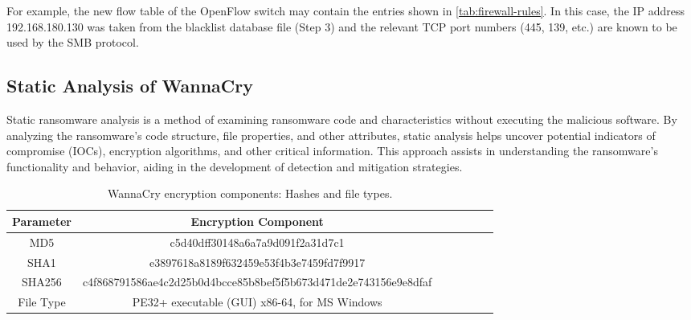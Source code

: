 \documentclass[12pt,letterpaper]{article}
\begin{document}
        For example, the new flow table of the OpenFlow switch may contain the entries shown in \autoref{tab:firewall-rules}. In this case, the IP address 192.168.180.130 was taken from the blacklist database file (Step 3) and the relevant TCP port numbers (445, 139, etc.) are known to be used by the SMB protocol.

    
    \subsection{Static Analysis of WannaCry}

        Static ransomware analysis is a method of examining ransomware code and characteristics without executing the malicious software. By analyzing the ransomware's code structure, file properties, and other attributes, static analysis helps uncover potential indicators of compromise (IOCs), encryption algorithms, and other critical information. This approach assists in understanding the ransomware's functionality and behavior, aiding in the development of detection and mitigation strategies.
    
            \begin{table}[ht]
                \centering
                \caption{WannaCry encryption components: Hashes and file types.}
                \label{tab:WannaCry Exec Components}
                \begin{tabular}{ccccccc}
                    \toprule
                    \textbf{Parameter} & \textbf{Encryption Component} \\
                    \midrule
                    MD5 & c5d40dff30148a6a7a9d091f2a31d7c1 \\
                    SHA1 & e3897618a8189f632459e53f4b3e7459fd7f9917 \\
                    SHA256 & c4f868791586ae4c2d25b0d4bcce85b8bef5f5b673d471de2e743156e9e8dfaf \\
                    File Type & PE32+ executable (GUI) x86-64, for MS Windows \\
                    \bottomrule
                \end{tabular}
            \end{table}
\end{document}
